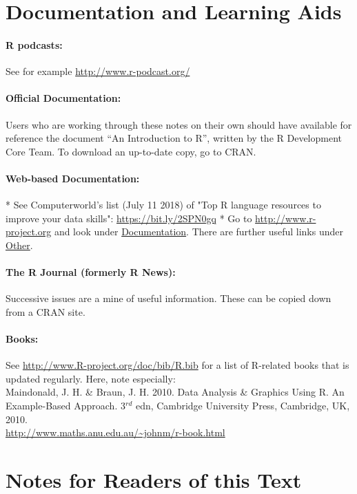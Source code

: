 \section*{Documentation and Learning Aids}
\paragraph{R podcasts:} See for example
\url{http://www.r-podcast.org/}

\paragraph{Official Documentation:}
Users who are working through these notes on their own should
have available for reference the document
``An Introduction to R'', written by the R Development Core Team.
To download an up-to-date copy, go to CRAN.

\paragraph{Web-based Documentation:}

* See Computerworld's list (July 11 2018) of "Top R language
resources to improve your data skills":  
\url{https://bit.ly/2SPN0gq}
* Go to \url{http://www.r-project.org}
and look under \underline{Documentation}.
There are further useful links under \underline{Other}.

\paragraph{The R Journal (formerly R News):}
Successive issues are a mine of useful information.
These can be copied down from a CRAN site.

\paragraph{Books:}
See \url{http://www.R-project.org/doc/bib/R.bib} for a list of
R-related books that is updated regularly. Here, note
especially:\\[3pt]
\noindent
Maindonald, J. H. \& Braun, J. H. 2010. Data Analysis \&
  Graphics Using R. An Example-Based Approach. 3$^{rd}$ edn, Cambridge
  University Press,
  Cambridge, UK, 2010.\\
\noindent
\url{http://www.maths.anu.edu.au/~johnm/r-book.html}

\cleardoublepage
\section*{Notes for Readers of this Text}

